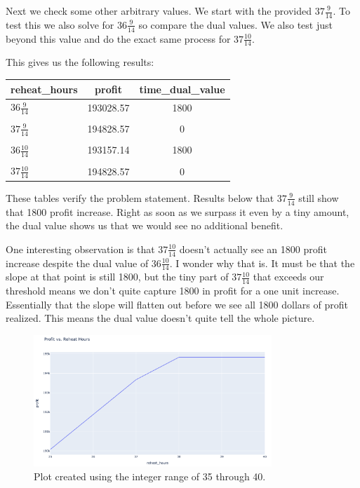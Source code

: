 Next we check some other arbitrary values. We start with the provided $37 \frac{9}{14}$. To test this we also solve for $36 \frac{9}{14}$ so compare the dual values. We also test just beyond this value and do the exact same process for $37 \frac{10}{14}$. 

This gives us the following results:

\begin{table}[!ht]
    \centering
    \begin{tabular}{lcc}
    \hline
        reheat\_hours & profit & time\_dual\_value \\ \hline
	$36 \frac{9}{14}$ & 193028.57 & 1800 \\\\ 
	$37 \frac{9}{14}$ & 194828.57 & 0 \\\\
    $36 \frac{10}{14}$ & 193157.14 & 1800 \\\\
	$37 \frac{10}{14}$ & 194828.57 & 0 \\
    \end{tabular}
\end{table}

These tables verify the problem statement. Results below that $37 \frac{9}{14}$ still show that 1800 profit increase. Right as soon as we surpass it even by a tiny amount, the dual value shows us that we would see no additional benefit. 

One interesting observation is that $37 \frac{10}{14}$ doesn't actually see an 1800 profit increase despite the dual value of $36 \frac{10}{14}$. I wonder why that is. It must be that the slope at that point is still 1800, but the tiny part of $37 \frac{10}{14}$ that exceeds our threshold means we don't quite capture 1800 in profit for a one unit increase. Essentially that the slope will flatten out before we see all 1800 dollars of profit realized. This means the dual value doesn't quite tell the whole picture. 

\begin{figure}[htbp]
    \centering
    \includegraphics[width=0.8\textwidth]{../images/profit-vs-reheat-1.png}
    \caption{Plot created using the integer range of 35 through 40.}
    \label{fig:your_label}
\end{figure}


